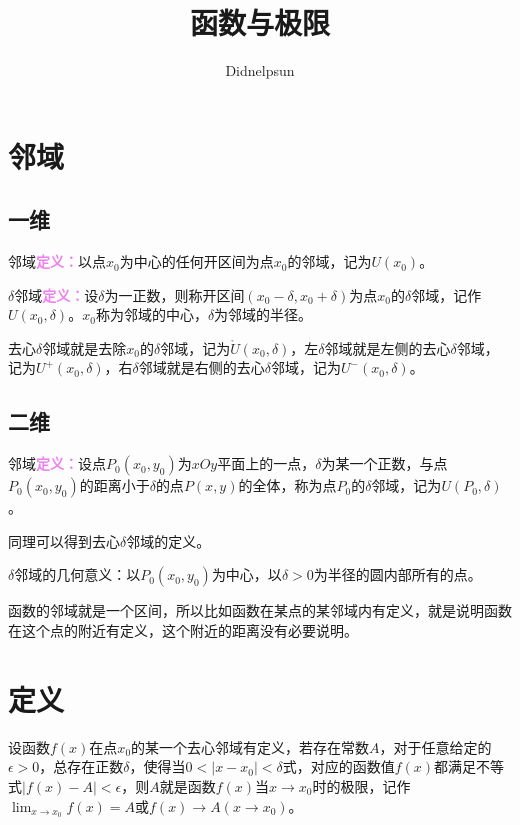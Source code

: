\documentclass[UTF8]{ctexart}
\author{Didnelpsun}
\title{函数与极限}
\begin{document}
\maketitle
\thispagestyle{empty}
\tableofcontents
\thispagestyle{empty}
\newpage
\pagestyle{plain}
\setcounter{page}{1}
\section{邻域}
\subsection{一维}

邻域\textcolor{violet}{\textbf{定义：}}以点$x_0$为中心的任何开区间为点$x_0$的邻域，记为$U(x_0)$。

$\delta$邻域\textcolor{violet}{\textbf{定义：}}设$\delta$为一正数，则称开区间$(x_0-\delta,x_0+\delta)$为点$x_0$的$\delta$邻域，记作$U(x_0,\delta)$。$x_0$称为邻域的中心，$\delta$为邻域的半径。

去心$\delta$邻域就是去除$x_0$的$\delta$邻域，记为$\mathring{U}(x_0,\delta)$，左$\delta$邻域就是左侧的去心$\delta$邻域，记为$U^+(x_0,\delta)$，右$\delta$邻域就是右侧的去心$\delta$邻域，记为$U^-(x_0,\delta)$。

\subsection{二维}

邻域\textcolor{violet}{\textbf{定义：}}设点$P_0(x_0,y_0)$为$xOy$平面上的一点，$\delta$为某一个正数，与点$P_0(x_0,y_0)$的距离小于$\delta$的点$P(x,y)$的全体，称为点$P_0$的$\delta$邻域，记为$U(P_0,\delta)$。

同理可以得到去心$\delta$邻域的定义。

$\delta$邻域的几何意义：以$P_0(x_0,y_0)$为中心，以$\delta>0$为半径的圆内部所有的点。

函数的邻域就是一个区间，所以比如函数在某点的某邻域内有定义，就是说明函数在这个点的附近有定义，这个附近的距离没有必要说明。

\section{定义}

设函数$f(x)$在点$x_0$的某一个去心邻域有定义，若存在常数$A$，对于任意给定的$\epsilon>0$，总存在正数$\delta$，使得当$0<\vert x-x_0\vert<\delta$式，对应的函数值$f(x)$都满足不等式$\vert f(x)-A\vert <\epsilon$，则$A$就是函数$f(x)$当$x\to x_0$时的极限，记作$\lim_{x\to x_0}f(x)=A$或$f(x)\rightarrow A(x\rightarrow x_0)$。
\end{document}
